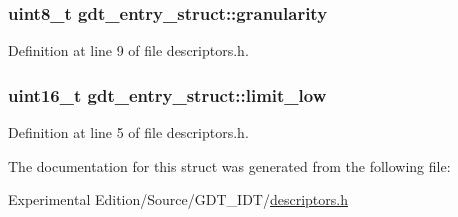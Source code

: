 \subsubsection[{\texorpdfstring{granularity}{granularity}}]{\setlength{\rightskip}{0pt plus 5cm}uint8\+\_\+t gdt\+\_\+entry\+\_\+struct\+::granularity}\hypertarget{structgdt__entry__struct_a7fb7b3704e10434dbe64564416cf1a25}{}\label{structgdt__entry__struct_a7fb7b3704e10434dbe64564416cf1a25}


Definition at line 9 of file descriptors.\+h.

\subsubsection[{\texorpdfstring{limit\+\_\+low}{limit_low}}]{\setlength{\rightskip}{0pt plus 5cm}uint16\+\_\+t gdt\+\_\+entry\+\_\+struct\+::limit\+\_\+low}\hypertarget{structgdt__entry__struct_a6bbf5ad7af7b8e8e7f7c26ec74d8c1b2}{}\label{structgdt__entry__struct_a6bbf5ad7af7b8e8e7f7c26ec74d8c1b2}


Definition at line 5 of file descriptors.\+h.



The documentation for this struct was generated from the following file\+:\begin{DoxyCompactItemize}
\item 
Experimental Edition/\+Source/\+G\+D\+T\+\_\+\+I\+D\+T/\hyperlink{descriptors_8h}{descriptors.\+h}\end{DoxyCompactItemize}
